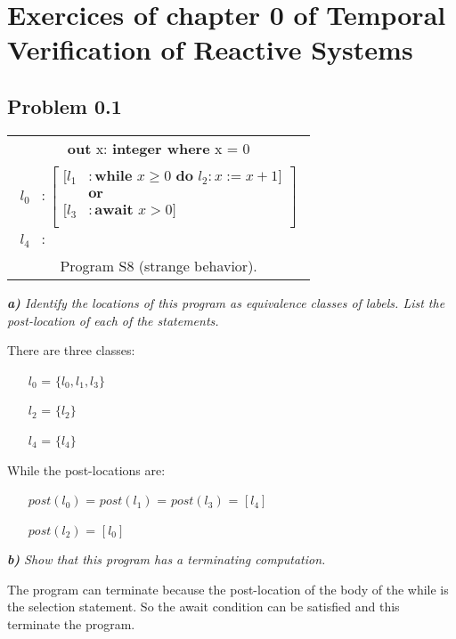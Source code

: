\documentclass[12pt]{article}
\begin{document}
\newpage
\section{Exercices of chapter 0 of Temporal Verification of Reactive Systems}
\subsection*{Problem 0.1}
\begin{center}
\begin{tabular}{|c|}
\hline
\textbf{out} x: \textbf{integer where} x = 0 \\

\parbox{4cm}{
  \begin{align*}
    l_0 &: \left[ \begin{aligned}
 		[l_1 &: \textbf{while }x \geq 0 \textbf{ do } l_2: x := x+1]\\ 
 		&\textbf{or} \\ 
 		[l_3 &: \textbf{await } x > 0] \\
		\end{aligned} \right]\\
 	l_4 &:
  \end{align*}}\\
Program S8 (strange behavior). \\
\hline
\end{tabular}
\end{center}

\textit{\textbf{a)} Identify the locations of this program as equivalence classes of labels. List the post-location of each of the statements.}

There are three classes:
\begin{itemize}
\item[$l_0$] = $\{ l_0,l_1,l_3 \} $
\item[$l_2$] = $\{ l_2 \} $
\item[$l_4$] = $\{ l_4 \} $
\end{itemize}

While the post-locations are:
\begin{itemize}
\item[$post(l_0)$] = $post(l_1)$ = $post(l_3)$ = $[ l_4 ] $
\item[$post(l_2)$] = $[ l_0 ] $
\end{itemize}

\textit{\textbf{b)} Show that this program has a terminating computation.}

The program can terminate because the post-location of the body of the while is the selection statement. So the await condition can be satisfied and this terminate the program.
\end{document}
